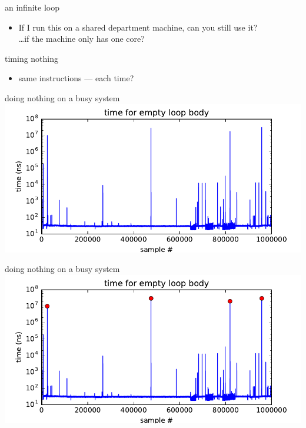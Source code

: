 \begin{frame}{an infinite loop}

\begin{itemize}
\item If I run this on a shared department machine, can you still use it? \\
\ldots if the machine only has one core?
\end{itemize}
\end{frame}

\begin{frame}{timing nothing}

\begin{itemize}
\item same instructions ---  each time?
\end{itemize}
\end{frame}

\begin{frame}{doing nothing on a busy system}
\includegraphics[width=\textwidth]{../kernel/empty-samples}
\end{frame}

\begin{frame}{doing nothing on a busy system}
\includegraphics[width=\textwidth]{../kernel/empty-samples-big-marked}
\end{frame}

